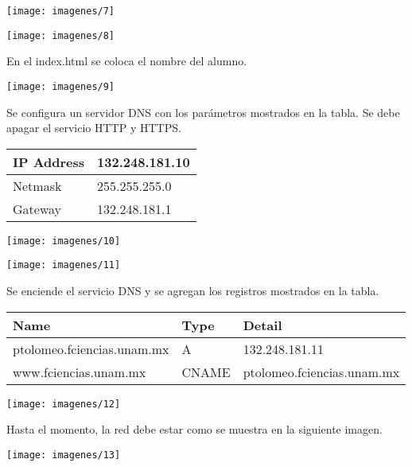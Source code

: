 \documentclass{article}
\begin{document}
\begin{center}
\texttt{[image: imagenes/7]}

\texttt{[image: imagenes/8]}
\end{center}

En el index.html se coloca el nombre del alumno.

\begin{center}
\texttt{[image: imagenes/9]}
\end{center}

Se configura un servidor DNS con los parámetros mostrados en la tabla. Se debe apagar el servicio HTTP y HTTPS.

\begin{center}
\begin{tabular}{|l|l|}
\hline
IP Address & 132.248.181.10 \\ \hline
Netmask & 255.255.255.0 \\ \hline
Gateway & 132.248.181.1 \\ \hline
\end{tabular}
\end{center}

\begin{center}
\texttt{[image: imagenes/10]}

\texttt{[image: imagenes/11]}
\end{center}

Se enciende el servicio DNS y se agregan los registros mostrados en la tabla.

\begin{center}
\begin{tabular}{|l|l|l|}
\hline
\textbf{Name} & \textbf{Type} & \textbf{Detail} \\ \hline
ptolomeo.fciencias.unam.mx & A & 132.248.181.11 \\ \hline
www.fciencias.unam.mx & CNAME & ptolomeo.fciencias.unam.mx \\ \hline
\end{tabular}
\end{center}

\begin{center}
\texttt{[image: imagenes/12]}
\end{center}

Hasta el momento, la red debe estar como se muestra en la siguiente imagen.

\begin{center}
\texttt{[image: imagenes/13]}
\end{center}
\end{document}
